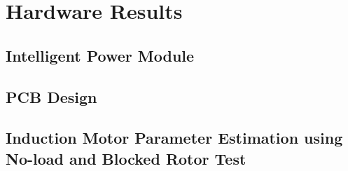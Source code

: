 \section{Hardware Results}

\subsection{Intelligent Power Module}

\subsection{PCB Design}

\subsection{Induction Motor Parameter Estimation using No-load and Blocked Rotor Test}
